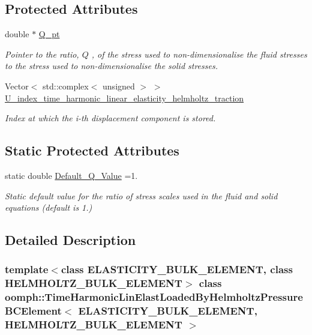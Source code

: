 \subsection*{Protected Attributes}
\begin{DoxyCompactItemize}
\item 
double $\ast$ \hyperlink{classoomph_1_1TimeHarmonicLinElastLoadedByHelmholtzPressureBCElement_ae5d333e308981db0bd733cbaa139a538}{Q\+\_\+pt}
\begin{DoxyCompactList}\small\item\em Pointer to the ratio, $ Q $ , of the stress used to non-\/dimensionalise the fluid stresses to the stress used to non-\/dimensionalise the solid stresses. \end{DoxyCompactList}\item 
Vector$<$ std\+::complex$<$ unsigned $>$ $>$ \hyperlink{classoomph_1_1TimeHarmonicLinElastLoadedByHelmholtzPressureBCElement_a65d16036ca5c85f6cf501a992f6e85df}{U\+\_\+index\+\_\+time\+\_\+harmonic\+\_\+linear\+\_\+elasticity\+\_\+helmholtz\+\_\+traction}
\begin{DoxyCompactList}\small\item\em Index at which the i-\/th displacement component is stored. \end{DoxyCompactList}\end{DoxyCompactItemize}
\subsection*{Static Protected Attributes}
\begin{DoxyCompactItemize}
\item 
static double \hyperlink{classoomph_1_1TimeHarmonicLinElastLoadedByHelmholtzPressureBCElement_a71a4d2fe30c7423a08c883843fec938b}{Default\+\_\+\+Q\+\_\+\+Value} =1.
\begin{DoxyCompactList}\small\item\em Static default value for the ratio of stress scales used in the fluid and solid equations (default is 1.) \end{DoxyCompactList}\end{DoxyCompactItemize}


\subsection{Detailed Description}
\subsubsection*{template$<$class E\+L\+A\+S\+T\+I\+C\+I\+T\+Y\+\_\+\+B\+U\+L\+K\+\_\+\+E\+L\+E\+M\+E\+NT, class H\+E\+L\+M\+H\+O\+L\+T\+Z\+\_\+\+B\+U\+L\+K\+\_\+\+E\+L\+E\+M\+E\+NT$>$\newline
class oomph\+::\+Time\+Harmonic\+Lin\+Elast\+Loaded\+By\+Helmholtz\+Pressure\+B\+C\+Element$<$ E\+L\+A\+S\+T\+I\+C\+I\+T\+Y\+\_\+\+B\+U\+L\+K\+\_\+\+E\+L\+E\+M\+E\+N\+T, H\+E\+L\+M\+H\+O\+L\+T\+Z\+\_\+\+B\+U\+L\+K\+\_\+\+E\+L\+E\+M\+E\+N\+T $>$}

